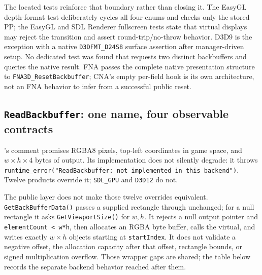 The located tests reinforce that boundary rather than closing it. The EasyGL depth-format
test deliberately cycles all four enums and checks only the stored PP; the EasyGL and SDL
Renderer fullscreen tests state that virtual displays may reject the transition and assert
round-trip/no-throw behavior. D3D9 is the exception with a native
\texttt{D3DFMT\_D24S8} surface assertion after manager-driven setup. No dedicated test was
found that requests two distinct  backbuffers and queries the native
result. FNA passes the complete native presentation structure to
\texttt{FNA3D\_ResetBackbuffer}; CNA's empty per-field hook is its own architecture, not an
FNA behavior to infer from a successful public reset.

\subsection{\texttt{ReadBackbuffer}: one name, four observable contracts}
\label{sec:backend-readback-matrix}

's comment promises RGBA8 pixels, top-left coordinates in game
space, and \(w\times h\times4\) bytes of output. Its implementation does not silently
degrade: it throws
\texttt{runtime\_error("ReadBackbuffer: not implemented in this backend")}. Twelve products
override it; \texttt{SDL\_GPU} and \texttt{D3D12} do not.

The public layer does not make those twelve overrides equivalent.
\texttt{GetBackBuffer\allowbreak Data()} passes a supplied rectangle through unchanged; for a
null rectangle it asks \texttt{GetViewport\allowbreak Size()} for \(w,h\). It rejects a null output
pointer and \texttt{elementCount < w*h}, then allocates an RGBA byte buffer, calls the virtual,
and writes exactly \(w\times h\)  objects starting at \texttt{startIndex}.
It does not validate a negative offset, the allocation capacity after that offset, rectangle
bounds, or signed multiplication overflow. Those wrapper gaps are shared; the table below
records the separate backend behavior reached after them.

